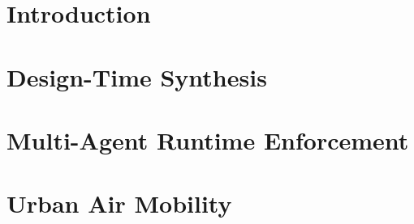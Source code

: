 \documentclass[12pt,twosided,openright]{report}	%
\theoremstyle{definition}
\theoremstyle{remark}
\begin{document}
\part{Introduction}


\part{Design-Time Synthesis}
 \label{sec:SurveiilanceChapter}


\part{Multi-Agent Runtime Enforcement}




\part{Urban Air Mobility}






%
%
%
%
%
%
%
%


\end{document}
